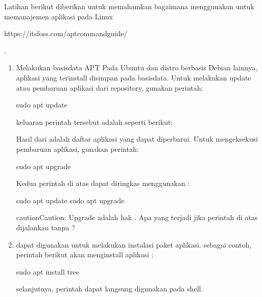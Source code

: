 \documentclass[letterpaper,10pt,english]{sphinxmanual}
\begin{document}
Latihan berikut diberikan untuk memahamkan bagaimana menggunakan  untuk memanajemen aplikasi pada Linux %
\begin{footnote}[2]\sphinxAtStartFootnote
https://itsfoss.com/apt\sphinxhyphen{}command\sphinxhyphen{}guide/
%
\end{footnote}.
\begin{enumerate}
%
\item {} 
Melakukan  basisdata APT
Pada Ubuntu dan distro berbasis Debian lainnya, aplikasi yang terinstall disimpan pada basisdata. Untuk melakukan update atau pembaruan aplikasi dari repository, gunakan perintah:

\begin{sphinxVerbatim}[commandchars=\\\{\}]
sudo apt update
\end{sphinxVerbatim}

keluaran perintah tersebut adalah seperti berikut:


Hasil dari  adalah daftar aplikasi yang dapat diperbarui. Untuk mengeksekusi pembaruan aplikasi, gunakan perintah:

\begin{sphinxVerbatim}[commandchars=\\\{\}]
sudo apt upgrade
\end{sphinxVerbatim}

Kedua perintah di atas dapat diringkas menggunakan \sphinxcode{\sphinxupquote{\&\&}} :

\begin{sphinxVerbatim}[commandchars=\\\{\}]
sudo apt update  sudo apt upgrade
\end{sphinxVerbatim}

\begin{sphinxadmonition}{caution}{Caution:}
Upgrade adalah hak . Apa yang terjadi jika perintah di atas dijalankan tanpa ?
\end{sphinxadmonition}

\item {} 
 dapat digunakan untuk melakukan instalasi paket aplikasi. sebagai contoh, perintah berikut akan menginstall aplikasi :

\begin{sphinxVerbatim}[commandchars=\\\{\}]
sudo apt install tree
\end{sphinxVerbatim}

selanjutnya, perintah  dapat langsung digunakan pada shell.

\end{enumerate}
\end{document}
